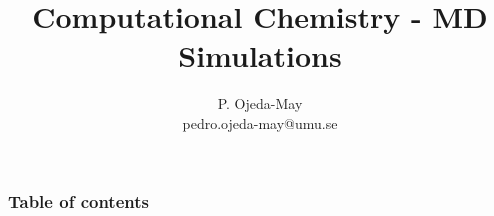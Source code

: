 \documentclass{beamer}
\begin{document}

\title{Computational Chemistry - MD Simulations} \author{P. Ojeda-May \\{\small pedro.ojeda-may@umu.se}} 

\date{}

\begin{frame}
\titlepage
\end{frame}

\begin{frame}\frametitle{Table of contents}\tableofcontents \end{frame}

%
%

%
%
%
%
%
%
\end{document}
